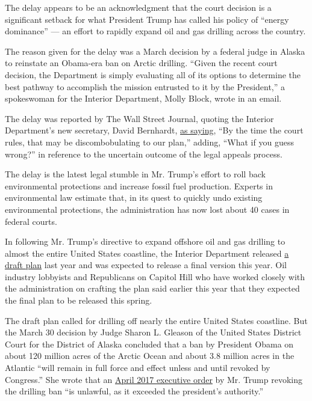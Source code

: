The delay appears to be an acknowledgment that the court decision is a
significant setback for what President Trump has called his policy of
``energy dominance'' --- an effort to rapidly expand oil and gas
drilling across the country.

The reason given for the delay was a March decision by a federal judge
in Alaska to reinstate an Obama-era ban on Arctic drilling. ``Given the
recent court decision, the Department is simply evaluating all of its
options to determine the best pathway to accomplish the mission
entrusted to it by the President,'' a spokeswoman for the Interior
Department, Molly Block, wrote in an email.

The delay was reported by The Wall Street Journal, quoting the Interior
Department's new secretary, David Bernhardt,
\href{https://www.wsj.com/articles/trumps-offshore-oil-drilling-plan-sidelined-indefinitely-11556208950?mod=e2tw}{as
saying}, ``By the time the court rules, that may be discombobulating to
our plan,'' adding, ``What if you guess wrong?'' in reference to the
uncertain outcome of the legal appeals process.

The delay is the latest legal stumble in Mr. Trump's effort to roll back
environmental protections and increase fossil fuel production. Experts
in environmental law estimate that, in its quest to quickly undo
existing environmental protections, the administration has now lost
about 40 cases in federal courts.

In following Mr. Trump's directive to expand offshore oil and gas
drilling to almost the entire United States coastline, the Interior
Department released
\href{https://www.nytimes3xbfgragh.onion/2018/01/04/climate/trump-offshore-drilling.html}{a
draft plan} last year and was expected to release a final version this
year. Oil industry lobbyists and Republicans on Capitol Hill who have
worked closely with the administration on crafting the plan said earlier
this year that they expected the final plan to be released this spring.

The draft plan called for drilling off nearly the entire United States
coastline. But the March 30 decision by Judge Sharon L. Gleason of the
United States District Court for the District of Alaska concluded that a
ban by President Obama on about 120 million acres of the Arctic Ocean
and about 3.8 million acres in the Atlantic ``will remain in full force
and effect unless and until revoked by Congress.'' She wrote that an
\href{https://www.nytimes3xbfgragh.onion/2017/04/25/us/politics/national-monuments-energy-drilling.html?module=inline}{April
2017 executive order} by Mr. Trump revoking the drilling ban ``is
unlawful, as it exceeded the president's authority.''

